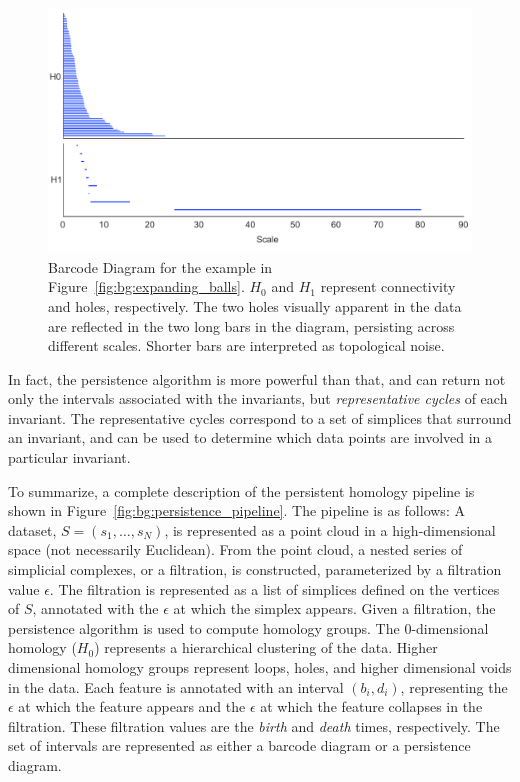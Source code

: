 \begin{figure}
\centering
\includegraphics[width=.75\textwidth]{fig/background/expanding_balls_barcode.pdf}
\caption[Barcode Diagram for the Two Circles Example]{Barcode Diagram for the example in Figure~\ref{fig:bg:expanding_balls}. $H_0$ and $H_1$ represent connectivity and holes, respectively. The two holes visually apparent in the data are reflected in the two long bars in the diagram, persisting across different scales. Shorter bars are interpreted as topological noise.}
\label{fig:bg:expanding_balls_barcode}
\end{figure}

In fact, the persistence algorithm is more powerful than that, and can return not only the intervals associated with the invariants, but \emph{representative cycles} of each invariant.
The representative cycles correspond to a set of simplices that surround an invariant, and can be used to determine which data points are involved in a particular invariant.

To summarize, a complete description of the persistent homology pipeline is shown in Figure~\ref{fig:bg:persistence_pipeline}.
The pipeline is as follows:
A dataset, $S=(s_{1},\ldots,s_{N})$, is represented as a point cloud in a high-dimensional space (not necessarily Euclidean).
From the point cloud, a nested series of simplicial complexes, or a filtration, is constructed, parameterized by a filtration value $\epsilon$.
The filtration is represented as a list of simplices defined on the vertices of $S$, annotated with the $\epsilon$ at which the simplex appears.
Given a filtration, the persistence algorithm is used to compute homology groups.
The $0$-dimensional homology ($H_0$) represents a hierarchical clustering of the data.
Higher dimensional homology groups represent loops, holes, and higher dimensional voids in the data.
Each feature is annotated with an interval $(b_i, d_i)$, representing the $\epsilon$ at which the feature appears and the $\epsilon$ at which the feature collapses in the filtration.
These filtration values are the \emph{birth} and \emph{death} times, respectively.
The set of intervals are represented as either a barcode diagram or a persistence diagram.

